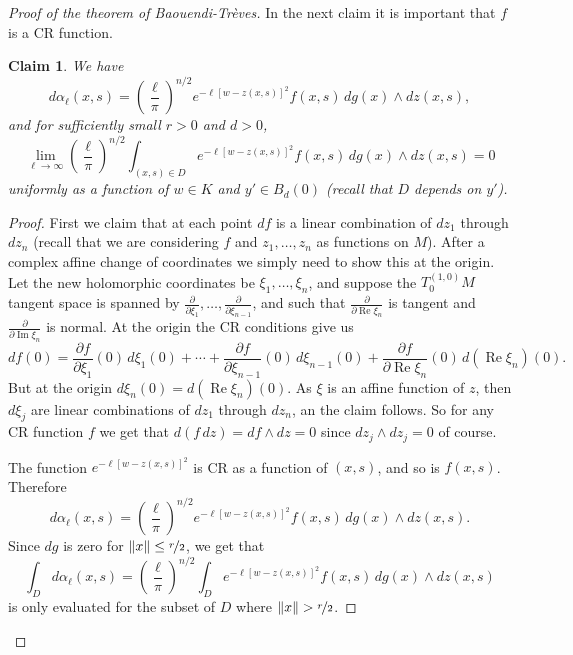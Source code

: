 \documentclass[12pt,openany]{book}
\renewcommand{\Re}{\operatorname{Re}}
\renewcommand{\Im}{\operatorname{Im}}
\newcommand{\snorm}[1]{\lVert {#1} \rVert}
\theoremstyle{plain}
\newtheorem{claim}[thm]{Claim}
\theoremstyle{remark}
\theoremstyle{definition}
\theoremstyle{exercise}
\theoremstyle{example}
\begin{document}
\begin{proof}[Proof of the theorem of Baouendi-Tr{\`e}ves]
In the next claim it is important that $f$ is a CR function.

\begin{claim}
We have
\begin{equation*}
d \alpha_\ell(x,s)
=
{\left(\frac{\ell}{\pi}\right)}^{n/2}
e^{-\ell [w - z(x,s)]^2} f(x,s)
\,
dg(x) 
\wedge
dz(x,s) ,
\end{equation*}
and for sufficiently small $r>0$ and $d>0$,
\begin{equation*}
\lim_{\ell\to\infty}
{\left(\frac{\ell}{\pi}\right)}^{n/2}
\int_{(x,s)\in D}
e^{-\ell [w - z(x,s)]^2} f(x,s)
\,
dg(x) 
\wedge
dz(x,s)
= 0
\end{equation*}
uniformly as a function of $w \in K$ and $y' \in B_d(0)$ (recall that $D$ depends on
$y'$).
\end{claim}

\begin{proof}
First we claim that at each point $df$ is a linear combination of $dz_1$
through $dz_n$ (recall that we are considering $f$ and $z_1,\ldots,z_n$ as
functions on $M$).  After a complex affine change of coordinates we simply
need to show this at the origin.  Let the new holomorphic coordinates be
$\xi_1,\ldots,\xi_n$, and suppose the $T^{(1,0)}_0 M$ tangent space is spanned
by $\frac{\partial}{\partial \xi_1},\ldots,\frac{\partial}{\partial
\xi_{n-1}}$, and such that $\frac{\partial}{\partial \Re \xi_n}$ is tangent
and $\frac{\partial}{\partial \Im \xi_n}$ is normal.  At the origin the CR conditions give us
\begin{equation*}
df(0) =
\frac{\partial f}{\partial \xi_1}(0) \, d\xi_1(0) + \cdots +
\frac{\partial f}{\partial \xi_{n-1}}(0) \, d\xi_{n-1}(0)  +
\frac{\partial f}{\partial \Re \xi_{n}}(0) \, d(\Re \xi_{n})(0) 
.
\end{equation*}
But at the origin $d\xi_n(0) = d(\Re \xi_n)(0)$.
As $\xi$ is an affine function of $z$, then $d\xi_j$ are linear
combinations of $dz_1$ through $dz_n$, an the claim follows.
So for any CR function
$f$ we get that $d(f\,dz) = df \wedge dz = 0$ since $dz_j \wedge dz_j = 0$ of course.

The function
$e^{-\ell [w - z(x,s)]^2}$ is CR as a function of $(x,s)$, and so
is $f(x,s)$.  Therefore
\begin{equation*}
d \alpha_{\ell}(x,s)
=
{\left(\frac{\ell}{\pi}\right)}^{n/2}
e^{-\ell [w - z(x,s)]^2 } f(x,s)
\,
dg(x) 
\wedge
dz(x,s) .
\end{equation*}
Since $dg$ is zero for $\snorm{x} \leq \nicefrac{r}{2}$, we get that
\begin{equation*}
\int_D
d \alpha_\ell(x,s)
=
{\left(\frac{\ell}{\pi}\right)}^{n/2}
\int_D
e^{ -\ell [w - z(x,s)]^2} f(x,s)
\,
dg(x) 
\wedge
dz(x,s)
\end{equation*}
is only evaluated for the subset of $D$ where $\snorm{x} > \nicefrac{r}{2}$.


\end{proof}
\end{proof}
\end{document}
